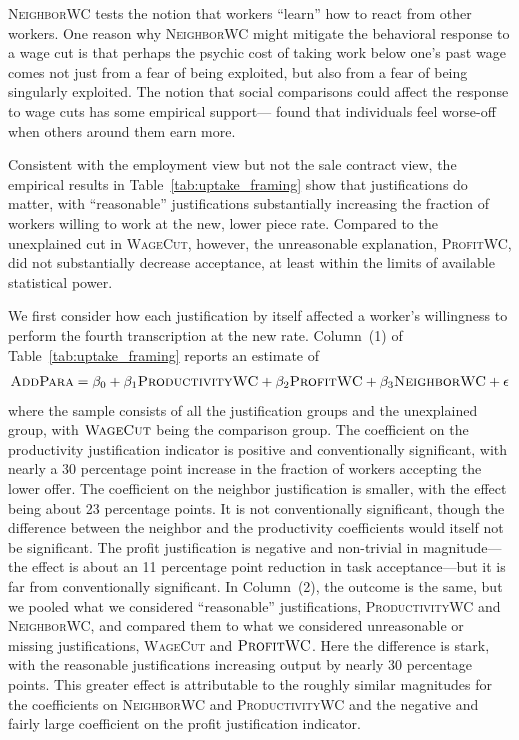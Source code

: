 \documentclass[11pt]{article}
\begin{document}
\textsc{NeighborWC} tests the notion that workers ``learn'' how to react from other workers. 
One reason why \textsc{NeighborWC} might mitigate the behavioral response to a wage cut is that perhaps the psychic cost of taking work below one's past wage comes not just from a fear of being exploited, but also from a fear of being singularly exploited. 
The notion that social comparisons could affect the response to wage cuts has some empirical support---\cite{luttmer2005} found that individuals feel worse-off when others around them earn more.

Consistent with the employment view but not the sale contract view, the empirical results in Table~\ref{tab:uptake_framing} show that justifications do matter, with ``reasonable'' justifications substantially increasing the fraction of workers willing to work at the new, lower piece rate.
Compared to the unexplained cut in \textsc{WageCut}, however, the unreasonable explanation, \textsc{ProfitWC}, did not substantially decrease acceptance, at least within the limits of available statistical power.



We first consider how each justification by itself affected a worker's willingness to perform the fourth transcription at the new rate.  
Column~(1) of Table~\ref{tab:uptake_framing} reports an estimate of 
\begin{align}
  \textsc{AddPara} = \beta_0 + \beta_{1} \textsc{ProductivityWC} + \beta_{2} \textsc{ProfitWC} + \beta_{3} \textsc{NeighborWC} + \epsilon 
\end{align}
where the sample consists of all the justification groups and the unexplained group, with $\textsc{WageCut}$ being the comparison group. 
The coefficient on the productivity justification indicator is positive and conventionally significant, with nearly a 30 percentage point increase in the fraction of workers accepting the lower offer.
The coefficient on the neighbor justification is smaller, with the effect being about 23 percentage points.
It is not conventionally significant, though the difference between the neighbor and the productivity coefficients would itself not be significant.
The profit justification is negative and non-trivial in magnitude---the effect is about an 11 percentage point reduction in task acceptance---but it is far from conventionally significant.
In Column~(2), the outcome is the same, but we pooled what we considered ``reasonable'' justifications, \textsc{ProductivityWC} and \textsc{NeighborWC}, and compared them to what we considered unreasonable or missing justifications, \textsc{WageCut} and $\textsc{ProfitWC}$. 
Here the difference is stark, with the reasonable justifications increasing output by nearly 30 percentage points.
This greater effect is attributable to the roughly similar magnitudes for the coefficients on \textsc{NeighborWC} and \textsc{ProductivityWC} and the negative and fairly large coefficient on the profit justification indicator. 
\end{document}
